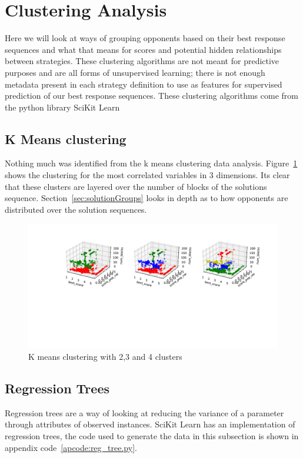 \section{Clustering Analysis}
Here we will look at ways of grouping opponents based on their best response sequences and what that means for scores and potential hidden relationships between strategies.
These clustering algorithms are not meant for predictive purposes and are all forms of unsupervised learning; there is not enough metadata present in each strategy definition to use as features for supervised prediction of our best response sequences.
These clustering algorithms come from the python library SciKit Learn~\cite{pedregosa2011scikit}

\subsection{K Means clustering~\cite{bora2014effect}}\label{ssec:k_means}
Nothing much was identified from the k means clustering data analysis.
Figure~\ref{fig:k_means} shows the clustering for the most correlated variables in 3 dimensions.
Its clear that these clusters are layered over the number of blocks of the solutions sequence.
Section~\ref{sec:solutionGroups} looks in depth as to how opponents are distributed over the solution sequences.  

\begin{figure}[ht]
    \includegraphics[width=1.0\textwidth, center]{./img/descriptive/k_means.pdf}
    \caption{K means clustering with 2,3 and 4 clusters}\label{fig:k_means}
\end{figure}

\subsection{Regression Trees}
Regression trees are a way of looking at reducing the variance of a parameter through attributes of observed instances. 
SciKit Learn has an implementation of regression trees, the code used to generate the data in this subsection is shown in appendix code~\ref{apcode:reg_tree.py}.

